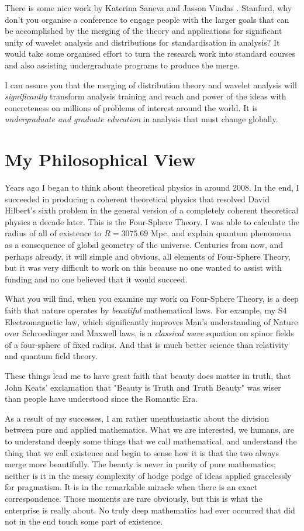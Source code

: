 \documentclass{amsart}
\begin{document}
There is some nice work by Katerina Saneva and Jasson Vindas \cite{SV}.  Stanford, why don't you organise a conference to engage people with the larger goals that can be accomplished by the merging of the theory and applications for significant unity of wavelet analysis and distributions for standardisation in analysis?  It would take some organised effort to turn the research work into standard courses and also assisting undergraduate programs to produce the merge.

I can assure you that the merging of distribution theory and wavelet analysis will {\em significantly} transform analysis training and reach and power of the ideas with concreteness on millions of problems of interest around the world.  It is {\em undergraduate and graduate education} in analysis that must change globally.

\section{My Philosophical View}

Years ago I began to think about theoretical physics in around 2008.  In the end, I succeeded in producing a coherent theoretical physics that resolved David Hilbert's sixth problem in the general version of a completely coherent theoretical physics a decade later.  This is the Four-Sphere Theory.  I was able to calculate the radius of all of existence to $R=3075.69$ Mpc, and explain quantum phenomena as a consequence of global geometry of the universe.  Centuries from now, and perhaps already, it will simple and obvious, all elements of Four-Sphere Theory, but it was very difficult to work on this because no one wanted to assist with funding and no one believed that it would succeed.

What you will find, when you examine my work on Four-Sphere Theory, is a deep faith that nature operates by {\em beautiful} mathematical laws.  For example, my S4 Electromagnetic law, which significantly improves Man's understanding of Nature over Schroedinger and Maxwell laws, is a {\em classical wave} equation on spinor fields of a four-sphere of fixed radius.  And that is much better science than relativity and quantum field theory.  

These things lead me to have great faith that beauty does matter in truth, that John Keats' exclamation that "Beauty is Truth and Truth Beauty" was wiser than people have understood since the Romantic Era.

As a result of my successes, I am rather unenthusiastic about the division between pure and applied mathematics.  What we are interested, we humans, are to understand deeply some things that we call mathematical, and understand the thing that we call existence and begin to sense how it is that the two always merge more beautifully.  The beauty is never in purity of pure mathematics; neither is it in the messy complexity of hodge podge of ideas applied gracelessly for pragmatism.  It is in the remarkable miracle when there is an exact correspondence.  Those moments are rare obviously, but this is what the enterprise is really about.  No truly deep mathematics had ever occurred that did not in the end touch some part of existence. 
\end{document}
